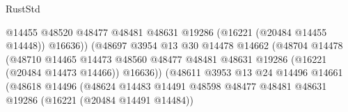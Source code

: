 \begin{lexlean}{RustStd}
\begin{coremodule}
                                                    @14455
                                                    @48520
                                                    @48477
                                                    @48481
                                                    @48631
                                                    @19286
                                                    (@16221 (@20484 @14455 @14448))
                                                    @16636))
                                                (@48697
                                                  @3954
                                                  @13
                                                  @30
                                                  @14478
                                                  @14662
                                                  (@48704
                                                    @14478
                                                    (@48710
                                                      @14465
                                                      @14473
                                                      @48560
                                                      @48477
                                                      @48481
                                                      @48631
                                                      @19286
                                                      (@16221 (@20484 @14473 @14466))
                                                      @16636))
                                                  (@48611
                                                    @3953
                                                    @13
                                                    @24
                                                    @14496
                                                    @14661
                                                    (@48618
                                                      @14496
                                                      (@48624
                                                        @14483
                                                        @14491
                                                        @48598
                                                        @48477
                                                        @48481
                                                        @48631
                                                        @19286
                                                        (@16221 (@20484 @14491 @14484))

\end{coremodule}
\end{lexlean}
